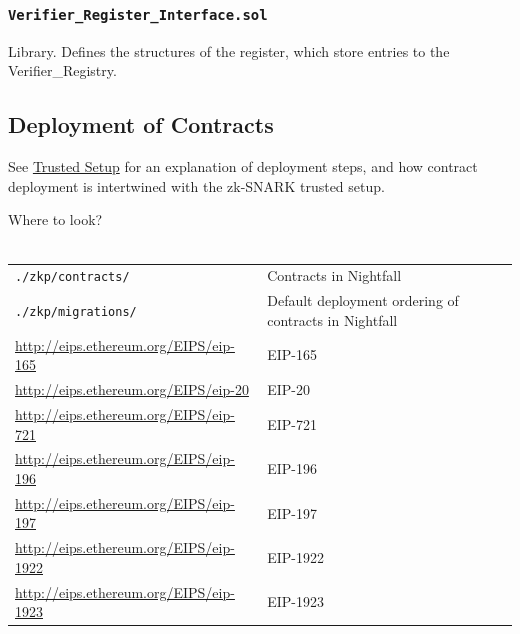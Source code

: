 \subsubsection{\texttt{Verifier\_Register\_Interface.sol}}
Library. Defines the structures of the register, which store entries to the Verifier\_Registry.

\subsection{Deployment of Contracts}
\label{sec:deploymentOfContracts}
See \hyperref[fig:trustedSetup]{Trusted Setup} for an explanation of deployment steps, and how contract deployment is intertwined with the zk-SNARK trusted setup.

\begin{center}
	\begin{mdframed}[backgroundcolor=verylightblue]
		Where to look?\\
		\\
		\begin{tabular}{lp{14cm}}
			\texttt{./zkp/contracts/} & Contracts in Nightfall\\
			\texttt{./zkp/migrations/} & Default deployment ordering of contracts in Nightfall\\
			\url{http://eips.ethereum.org/EIPS/eip-165} & EIP-165\\
			\url{http://eips.ethereum.org/EIPS/eip-20} & EIP-20\\
			\url{http://eips.ethereum.org/EIPS/eip-721} & EIP-721\\
			\url{http://eips.ethereum.org/EIPS/eip-196} & EIP-196\\
			\url{http://eips.ethereum.org/EIPS/eip-197} & EIP-197\\
			\url{http://eips.ethereum.org/EIPS/eip-1922} & EIP-1922\\
			\url{http://eips.ethereum.org/EIPS/eip-1923} & EIP-1923
		\end{tabular}
	\end{mdframed}
\end{center}





